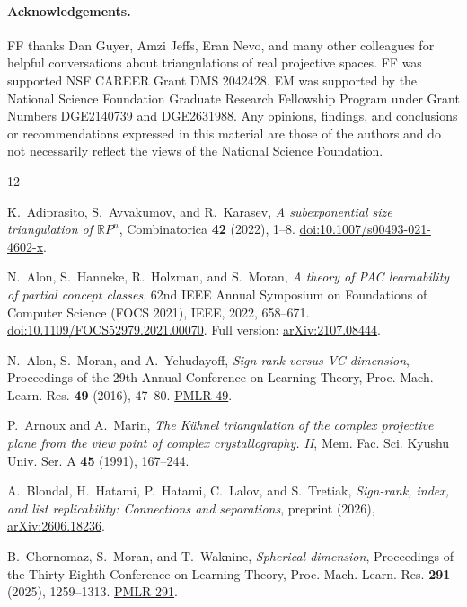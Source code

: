 \documentclass[11pt]{article}
\theoremstyle{remark}
\begin{document}
\paragraph{Acknowledgements.} 
FF thanks Dan Guyer, Amzi Jeffs, Eran Nevo, and many other colleagues
for helpful conversations about triangulations of real projective spaces.
FF was supported NSF CAREER Grant DMS 2042428.
EM was supported by the National Science Foundation Graduate Research Fellowship Program under Grant Numbers DGE2140739 and DGE2631988. Any opinions, findings, and conclusions or recommendations expressed in this material are those of the authors and do not necessarily reflect the views of the National Science Foundation.

\begin{thebibliography}{12}

K.~Adiprasito, S.~Avvakumov, and R.~Karasev,
\emph{A subexponential size triangulation of $\mathbb RP^n$},
Combinatorica \textbf{42} (2022), 1--8.
\href{https://doi.org/10.1007/s00493-021-4602-x}{doi:10.1007/s00493-021-4602-x}.

N.~Alon, S.~Hanneke, R.~Holzman, and S.~Moran,
\emph{A theory of PAC learnability of partial concept classes},
62nd IEEE Annual Symposium on Foundations of Computer Science
(FOCS 2021), IEEE, 2022, 658--671.
\href{https://doi.org/10.1109/FOCS52979.2021.00070}{doi:10.1109/FOCS52979.2021.00070}.
Full version:
\href{https://arxiv.org/abs/2107.08444}{arXiv:2107.08444}.

N.~Alon, S.~Moran, and A.~Yehudayoff,
\emph{Sign rank versus VC dimension},
Proceedings of the 29th Annual Conference on Learning Theory,
Proc. Mach. Learn. Res. \textbf{49} (2016), 47--80.
\href{https://proceedings.mlr.press/v49/alon16.html}{PMLR 49}.

P.~Arnoux and A.~Marin,
\emph{The K\"uhnel triangulation of the complex projective plane from the
view point of complex crystallography. II},
Mem. Fac. Sci. Kyushu Univ. Ser. A \textbf{45} (1991), 167--244.

A.~Blondal, H.~Hatami, P.~Hatami, C.~Lalov, and S.~Tretiak,
\emph{Sign-rank, index, and list replicability: Connections and separations},
preprint (2026),
\href{https://arxiv.org/abs/2606.18236}{arXiv:2606.18236}.

B.~Chornomaz, S.~Moran, and T.~Waknine,
\emph{Spherical dimension},
Proceedings of the Thirty Eighth Conference on Learning Theory,
Proc. Mach. Learn. Res. \textbf{291} (2025), 1259--1313.
\href{https://proceedings.mlr.press/v291/chornomaz25a.html}{PMLR 291}.


\end{thebibliography}
\end{document}
